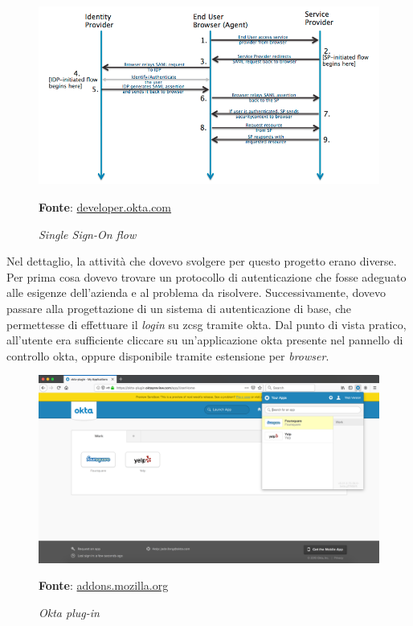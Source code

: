     \begin{figure}[ht]
        \centering
        \includegraphics[width=1\textwidth]{immagini/sso_flow.png}
        \caption{\textit{Single Sign-On flow}}
        \textbf{Fonte}:
        \href{https://developer.okta.com/docs/concepts/saml/#federated-identity}{developer.okta.com}
        \label{fig: Single Sign-On flow}
    \end{figure}
Nel dettaglio, la attività che dovevo svolgere per questo progetto erano diverse. Per prima cosa dovevo trovare un protocollo di autenticazione che fosse adeguato alle esigenze dell'azienda e al problema da risolvere. Successivamente, dovevo passare alla progettazione di un sistema di autenticazione di base, che permettesse di effettuare il \textit{login} su \gls{zcsg} tramite \gls{okta}. Dal punto di vista pratico, all'utente era sufficiente cliccare su un'applicazione \gls{okta} presente nel pannello di controllo \gls{okta}, oppure disponibile tramite estensione per \textit{browser}.
\newpage
    \begin{figure}[ht]
        \centering
        \includegraphics[width=1\textwidth]{immagini/okta_plugin.png}
        \caption{\textit{Okta plug-in}}
        \textbf{Fonte}:
        \href{https://addons.mozilla.org/en-US/firefox/addon/okta-browser-plugin/}{addons.mozilla.org}
        \label{fig: Okta plug-in}
    \end{figure}
    
